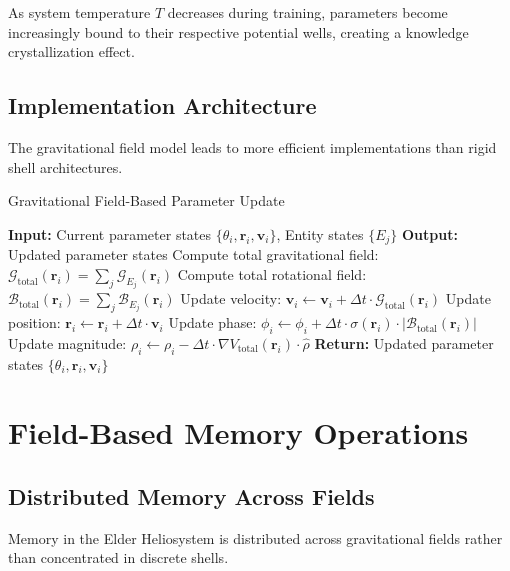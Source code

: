 \begin{corollary}
As system temperature $T$ decreases during training, parameters become increasingly bound to their respective potential wells, creating a knowledge crystallization effect.
\end{corollary}

\subsection{Implementation Architecture}

The gravitational field model leads to more efficient implementations than rigid shell architectures.

\begin{algorithm}
\caption{Gravitational Field-Based Parameter Update}
\begin{algorithmic}[1]
\State \textbf{Input:} Current parameter states $\{\theta_i, \mathbf{r}_i, \mathbf{v}_i\}$, Entity states $\{E_j\}$
\State \textbf{Output:} Updated parameter states
    \State Compute total gravitational field: $\mathcal{G}_{\text{total}}(\mathbf{r}_i) = \sum_j \mathcal{G}_{E_j}(\mathbf{r}_i)$
    \State Compute total rotational field: $\mathcal{B}_{\text{total}}(\mathbf{r}_i) = \sum_j \mathcal{B}_{E_j}(\mathbf{r}_i)$
    \State Update velocity: $\mathbf{v}_i \gets \mathbf{v}_i + \Delta t \cdot \mathcal{G}_{\text{total}}(\mathbf{r}_i)$
    \State Update position: $\mathbf{r}_i \gets \mathbf{r}_i + \Delta t \cdot \mathbf{v}_i$
    \State Update phase: $\phi_i \gets \phi_i + \Delta t \cdot \sigma(\mathbf{r}_i) \cdot |\mathcal{B}_{\text{total}}(\mathbf{r}_i)|$
    \State Update magnitude: $\rho_i \gets \rho_i - \Delta t \cdot \nabla V_{\text{total}}(\mathbf{r}_i) \cdot \hat{\rho}$
\EndFor
\State \textbf{Return:} Updated parameter states $\{\theta_i, \mathbf{r}_i, \mathbf{v}_i\}$
\end{algorithmic}
\end{algorithm}

\section{Field-Based Memory Operations}

\subsection{Distributed Memory Across Fields}

Memory in the Elder Heliosystem is distributed across gravitational fields rather than concentrated in discrete shells.

